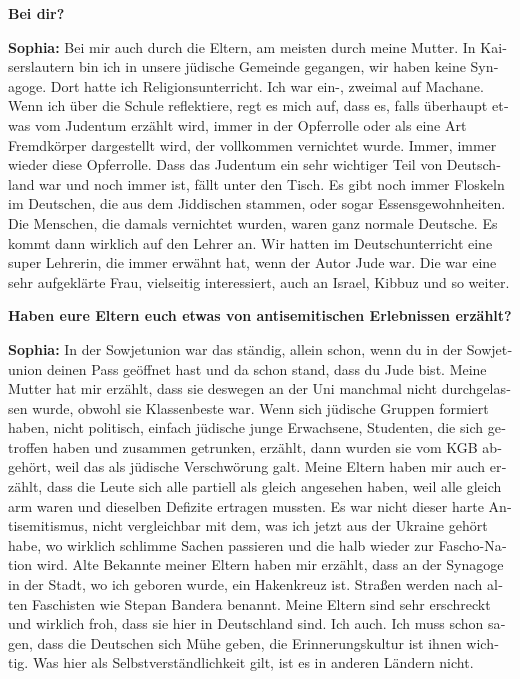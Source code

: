 \begin{otherlanguage}{ngerman}
\textbf{Bei dir?} 

\textbf{Sophia:} Bei mir auch durch die Eltern, am meisten durch meine Mutter. In Kaiserslautern bin ich in unsere jüdische Gemeinde gegangen, wir haben keine Synagoge. Dort hatte ich Religionsunterricht. Ich war ein-, zweimal auf Machane. Wenn ich über die Schule reflektiere, regt es mich auf, dass es, falls überhaupt etwas vom Judentum erzählt wird, immer in der Opferrolle oder als eine Art Fremdkörper dargestellt wird, der vollkommen vernichtet wurde. Immer, immer wieder diese Opferrolle. Dass das Judentum ein sehr wichtiger Teil von Deutschland war und noch immer ist, fällt unter den Tisch. Es gibt noch immer Floskeln im Deutschen, die aus dem Jiddischen stammen, oder sogar Essensgewohnheiten. Die Menschen, die damals vernichtet wurden, waren ganz normale Deutsche. Es kommt dann wirklich auf den Lehrer an. Wir hatten im Deutschunterricht eine super Lehrerin, die immer erwähnt hat, wenn der Autor Jude war. Die war eine sehr aufgeklärte Frau, vielseitig interessiert, auch an Israel, Kibbuz und so weiter. 

\textbf{Haben eure Eltern euch etwas von antisemitischen Erlebnissen erzählt?}\par                                                 \textbf{Sophia:} In der Sowjetunion war das ständig, allein schon, wenn du in der Sowjetunion deinen Pass geöffnet hast und da schon stand, dass du Jude bist. Meine Mutter hat mir erzählt, dass sie deswegen an der Uni manchmal nicht durchgelassen wurde, obwohl sie Klassenbeste war. Wenn sich jüdische Gruppen formiert haben, nicht politisch, einfach jüdische junge Erwachsene, Studenten, die sich getroffen haben und zusammen getrunken, erzählt, dann wurden sie vom KGB abgehört, weil das als jüdische Verschwörung galt. Meine Eltern haben mir auch erzählt, dass die Leute sich alle partiell als gleich angesehen haben, weil alle gleich arm waren und dieselben Defizite ertragen mussten. Es war nicht dieser harte Antisemitismus, nicht vergleichbar mit dem, was ich jetzt aus der Ukraine gehört habe, wo wirklich schlimme Sachen passieren und die halb wieder zur Fascho-Nation wird. Alte Bekannte meiner Eltern haben mir erzählt, dass an der Synagoge in der Stadt, wo ich geboren wurde, ein Hakenkreuz ist. Straßen werden nach alten Faschisten wie Stepan Bandera benannt. Meine Eltern sind sehr erschreckt und wirklich froh, dass sie hier in Deutschland sind. Ich auch. Ich muss schon sagen, dass die Deutschen sich Mühe geben, die Erinnerungskultur ist ihnen wichtig. Was hier als Selbstverständlichkeit gilt, ist es in anderen Ländern nicht. 


\end{otherlanguage}
